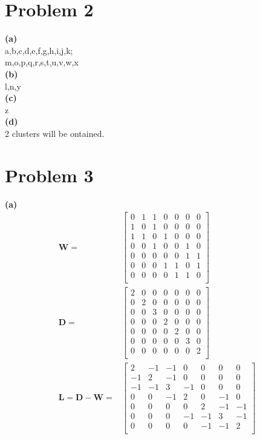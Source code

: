 \documentclass[11pt]{scrartcl}
\begin{document}
\section*{Problem 2}
\textbf{(a)}\\
a,b,c,d,e,f,g,h,i,j,k;\\
m,o,p,q,r,s,t,u,v,w,x\\
\textbf{(b)}\\
l,n,y\\
\textbf{(c)}\\
z\\
\textbf{(d)}\\
2 clusters will be ontained.\\
\section*{Problem 3}
\textbf{(a)}\\
\begin{equation*}
\begin{aligned}
\mathbf{W}=&
\begin{bmatrix}
0 & 1 & 1 & 0 & 0 & 0 & 0\\
1 & 0 & 1 & 0 & 0 & 0 & 0\\
1 & 1 & 0 & 1 & 0 & 0 & 0\\
0 & 0 & 1 & 0 & 0 & 1 & 0\\
0 & 0 & 0 & 0 & 0 & 1 & 1\\
0 & 0 & 0 & 1 & 1 & 0 & 1\\
0 & 0 & 0 & 0 & 1 & 1 & 0\\
\end{bmatrix}\\
\mathbf{D}=&
\begin{bmatrix}
2 & 0 & 0 & 0 & 0 & 0 & 0\\
0 & 2 & 0 & 0 & 0 & 0 & 0\\
0 & 0 & 3 & 0 & 0 & 0 & 0\\
0 & 0 & 0 & 2 & 0 & 0 & 0\\
0 & 0 & 0 & 0 & 2 & 0 & 0\\
0 & 0 & 0 & 0 & 0 & 3 & 0\\
0 & 0 & 0 & 0 & 0 & 0 & 2\\
\end{bmatrix}\\
\mathbf{L}=\mathbf{D}-\mathbf{W}=&
\begin{bmatrix}
 2 &-1 &-1 & 0 & 0 & 0 & 0\\
-1 & 2 &-1 & 0 & 0 & 0 & 0\\
-1 &-1 & 3 &-1 & 0 & 0 & 0\\
 0 & 0 &-1 & 2 & 0 &-1 & 0\\
 0 & 0 & 0 & 0 & 2 &-1 &-1\\
 0 & 0 & 0 &-1 &-1 & 3 &-1\\
 0 & 0 & 0 & 0 &-1 &-1 & 2\\
\end{bmatrix}\\
\end{aligned}
\end{equation*}
\end{document}
